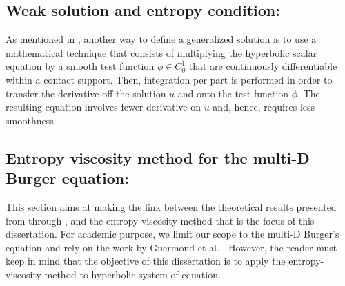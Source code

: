 \subsection{Weak solution and entropy condition:}\label{weak_sct1b}
As mentioned in , another way to define a generalized solution is to use a mathematical technique that consists of multiplying the hyperbolic scalar equation by a smooth test function $\phi \in C^1_0$ that are continuously differentiable within a contact support. Then, integration per part is performed in order to transfer the derivative off the solution $u$ and onto the test function $\phi$. The resulting equation involves fewer derivative on $u$ and, hence, requires less smoothness. 
\subsection{Entropy viscosity method for the multi-D Burger equation:}
This section aims at making the link between the theoretical results presented from  through , and the entropy viscosity method that is the focus of this dissertation. For academic purpose, we limit our scope to the multi-D Burger's equation and rely on the work by Guermond et al. \cite{jlg1, jlg2, jlg3, valentin}. However, the reader must keep in mind that the objective of this dissertation is to apply the entropy-viscosity method to hyperbolic system of equation.

